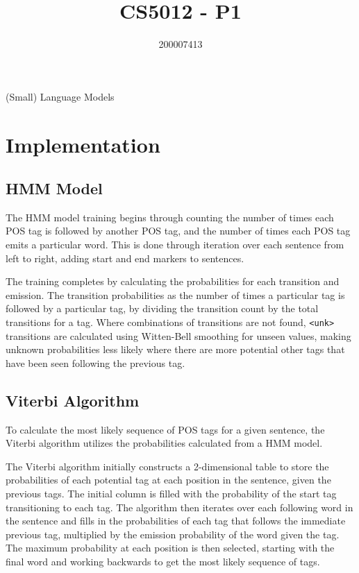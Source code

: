 \documentclass[a4paper, 12pt]{article}
\title{CS5012 - P1}
\author{200007413}
\date{}
\begin{document}
\begin{titlepage}
    \centering
    \vspace*{\fill}
    {\Huge\thetitle}

    {\LARGE(Small) Language Models}
    
    {\large\theauthor}
    \vspace*{\fill}
\end{titlepage}

\pagebreak

\section{Implementation}


\subsection{HMM Model}

The HMM model training begins through counting the number of times each POS tag is followed by another POS tag, and the number of times each POS tag emits a particular word.
This is done through iteration over each sentence from left to right, adding start and end markers to sentences.

The training completes by calculating the probabilities for each transition and emission. The transition probabilities as the number of times a particular tag is followed by a particular tag, by dividing the transition count by the total transitions for a tag. Where combinations of transitions are not found, \texttt{<unk>} transitions are calculated using Witten-Bell smoothing for unseen values, making unknown probabilities less likely where there are more potential other tags that have been seen following the previous tag.

\subsection{Viterbi Algorithm}

To calculate the most likely sequence of POS tags for a given sentence, the Viterbi algorithm utilizes the probabilities calculated from a HMM model. 

The Viterbi algorithm initially constructs a 2-dimensional table to store the probabilities of each potential tag at each position in the sentence, given the previous tags. The initial column is filled with the probability of the start tag transitioning to each tag. The algorithm then iterates over each following word in the sentence and fills in the probabilities of each tag that follows the immediate previous tag, multiplied by the emission probability of the word given the tag. The maximum probability at each position is then selected, starting with the final word and working backwards to get the most likely sequence of tags.
\end{document}
